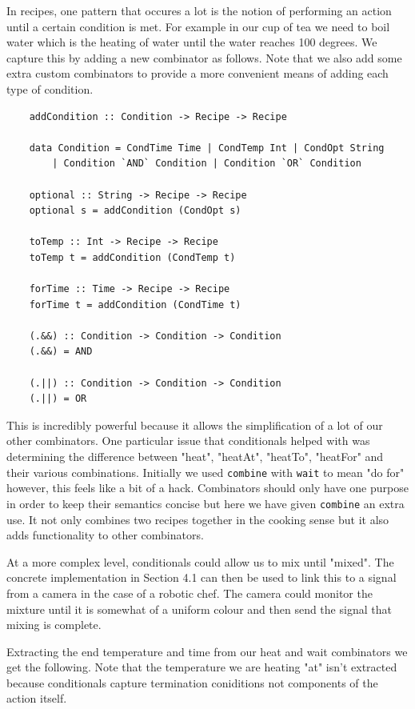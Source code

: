 \documentclass[11pt]{article}
\begin{document}
In recipes, one pattern that occures a lot is the notion of performing an action until
a certain condition is met. For example in our cup of tea we need to boil water which is
the heating of water until the water reaches 100 degrees. We capture this by adding a new
combinator as follows. Note that we also add some extra custom combinators to provide
a more convenient means of adding each type of condition.

\begin{lstlisting}
    addCondition :: Condition -> Recipe -> Recipe

    data Condition = CondTime Time | CondTemp Int | CondOpt String
        | Condition `AND` Condition | Condition `OR` Condition

    optional :: String -> Recipe -> Recipe
    optional s = addCondition (CondOpt s)

    toTemp :: Int -> Recipe -> Recipe
    toTemp t = addCondition (CondTemp t)

    forTime :: Time -> Recipe -> Recipe
    forTime t = addCondition (CondTime t)

    (.&&) :: Condition -> Condition -> Condition
    (.&&) = AND

    (.||) :: Condition -> Condition -> Condition
    (.||) = OR
\end{lstlisting}

This is incredibly powerful because it allows the simplification of a lot of our other
combinators. One particular issue that conditionals helped with was determining the
difference between "heat", "heatAt", "heatTo", "heatFor" and their various combinations.
Initially we used \texttt{combine} with \texttt{wait} to mean "do for" however, this
feels like a bit of a hack. Combinators should only have one purpose in order to keep
their semantics concise but here we have given \texttt{combine} an extra use. It not
only combines two recipes together in the cooking sense but it also adds functionality
to other combinators.

\medbreak

At a more complex level, conditionals could allow us to mix until "mixed".
The concrete implementation in Section 4.1 can then be used to link this to a signal
from a camera in the case of a robotic chef. The camera could monitor the mixture
until it is somewhat of a uniform colour and then send the signal that mixing is complete.

\medbreak

Extracting the end temperature and time from our heat and wait combinators we get the
following. Note that the temperature we are heating "at" isn't extracted because
conditionals capture termination coniditions not components of the action itself.
\end{document}
